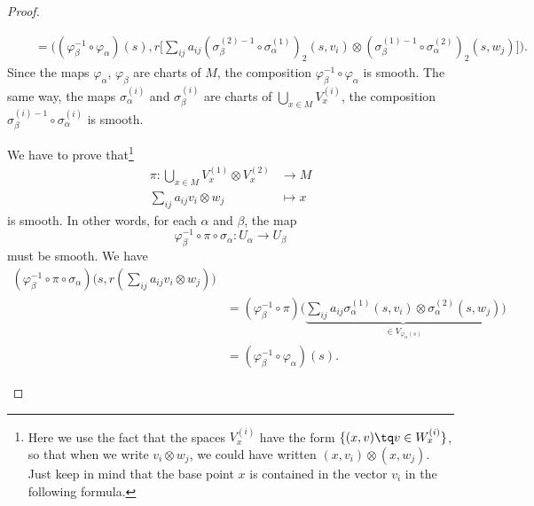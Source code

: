 \begin{proof}
\begin{subproof}
\begin{subproof}
\begin{subproof}
\begin{subequations}
\begin{align}
						 & \quad = \Big( (\varphi_{\beta}^{-1}\circ\varphi_{\alpha})(s),r\big[  \sum_{ij}a_{ij}(\sigma_{\beta}^{(2)-1}\circ\sigma_{\alpha}^{(1)})_2(s,v_i)\otimes (\sigma_{\beta}^{(1)-1}\circ\sigma_{\alpha}^{(2)})_2(s,w_j) \big] \Big).
					\end{align}
				\end{subequations}
				Since the maps \( \varphi_{\alpha}\), \( \varphi_{\beta}\) are charts of \( M\), the composition \( \varphi_{\beta}^{-1}\circ\varphi_{\alpha}\) is smooth. The same way, the maps \( \sigma_{\alpha}^{(i)}\) and \( \sigma_{\beta}^{(i)} \) are charts of \( \bigcup_{x\in M}V_x^{(i)}\), the composition \( \sigma_{\beta}^{(i)-1}\circ \sigma_{\alpha}^(i)\) is smooth.
			\end{subproof}
		\end{subproof}
		We have to prove that\footnote{Here we use the fact that the spaces \( V_x^{(i)}\) have the form \( \{ (x,v)\tq v\in W_x^{(i)} \}\), so that when we write \( v_i\otimes w_j\), we could have written \( (x,v_i)\otimes (x,w_j)\). Just keep in mind that the base point \( x\) is contained in the vector \( v_i\) in the following formula.}
		\begin{equation}
			\begin{aligned}
				\pi\colon \bigcup_{x\in M}V_x^{(1)}\otimes V_x^{(2)} & \to M     \\
				\sum_{ij}a_{ij}v_i\otimes w_j                        & \mapsto x
			\end{aligned}
		\end{equation}
		is smooth. In other words, for each \( \alpha\) and \( \beta\), the map
		\begin{equation}
			\varphi_{\beta}^{-1}\circ \pi\circ \sigma_{\alpha} \colon U_{\alpha}\to U_{\beta}
		\end{equation}
		must be smooth. We have
		\begin{subequations}
			\begin{align}
				(\varphi_{\beta}^{-1}\circ\pi\circ\sigma_{\alpha})\big( s,r(\sum_{ij}a_{ij}v_i\otimes w_j) \big)                                                                         \\
				 & =(\varphi_{\beta}^{-1}\circ\pi)\Big( \underbrace{\sum_{ij}a_{ij}\sigma_{\alpha}^{(1)}(s,v_i)\otimes \sigma_{\alpha}^{(2)}(s,w_j)}_{\in V_{\varphi_{\alpha}(s)}} \Big) \\
				 & =(\varphi_{\beta}^{-1}\circ\varphi_{\alpha})(s).

\end{align}
\end{subequations}
\end{subproof}
\end{proof}
